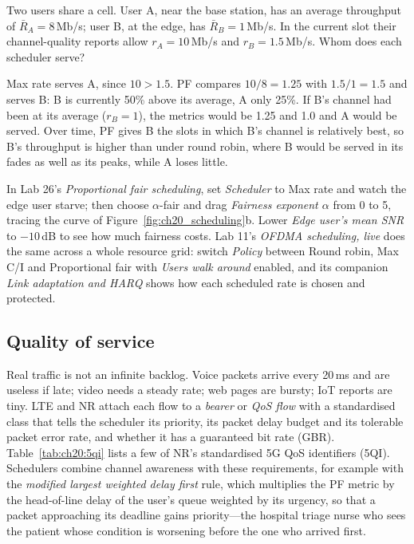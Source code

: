 \begin{worked}
Two users share a cell. User A, near the base station, has an average throughput of $\bar R_A=8$\,Mb/s; user B, at the
edge, has $\bar R_B=1$\,Mb/s. In the current slot their channel-quality reports allow $r_A=10$\,Mb/s and $r_B=1.5$\,Mb/s. Whom
does each scheduler serve?

Max rate serves A, since $10>1.5$. PF compares $10/8=1.25$ with $1.5/1=1.5$ and serves B: B is currently 50\% above its
average, A only 25\%. If B's channel had been at its average ($r_B=1$), the metrics would be 1.25 and 1.0 and A would be
served. Over time, PF gives B the slots in which B's channel is relatively best, so B's throughput is higher than under
round robin, where B would be served in its fades as well as its peaks, while A loses little.
\end{worked}

\begin{tryit}
In Lab 26's \emph{Proportional fair scheduling}, set \emph{Scheduler} to Max rate and watch the edge user starve; then
choose $\alpha$-fair and drag \emph{Fairness exponent $\alpha$} from 0 to 5, tracing the curve of
Figure~\ref{fig:ch20_scheduling}b. Lower \emph{Edge user's mean SNR} to $-10$\,dB to see how much fairness costs.
Lab 11's \emph{OFDMA scheduling, live} does the same across a whole resource grid: switch \emph{Policy} between Round
robin, Max C/I and Proportional fair with \emph{Users walk around} enabled, and its companion \emph{Link adaptation and
HARQ} shows how each scheduled rate is chosen and protected.
\end{tryit}

\subsection{Quality of service}

Real traffic is not an infinite backlog. Voice packets arrive every 20\,ms and are useless if late; video needs a steady
rate; web pages are bursty; IoT reports are tiny. LTE and NR attach each flow to a \emph{bearer} or \emph{QoS flow} with a
standardised class that tells the scheduler its priority, its packet delay budget and its tolerable packet error rate,
and whether it has a guaranteed bit rate (GBR). Table~\ref{tab:ch20:5qi} lists a few of NR's standardised 5G QoS
identifiers (5QI). Schedulers combine channel awareness with these requirements, for example with the
\emph{modified largest weighted delay first} rule, which multiplies the PF metric by the head-of-line delay of the
user's queue weighted by its urgency, so that a packet approaching its deadline gains priority---the hospital triage
nurse who sees the patient whose condition is worsening before the one who arrived first.

